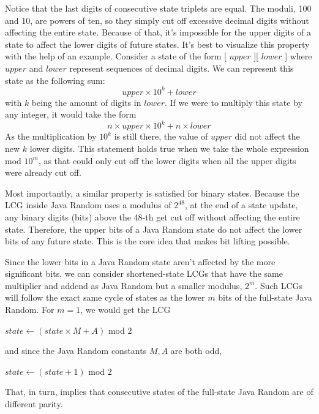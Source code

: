\documentclass{article}
\begin{document}
Notice that the last digits of consecutive state triplets are equal. The moduli, 100 and 10, are powers of ten, so they simply cut off excessive decimal digits without affecting the entire state. Because of that, it’s impossible for the upper digits of a state to affect the lower digits of future states. It’s best to visualize this property with the help of an example. Consider a state of the form [ $upper$ ][ $lower$ ] where $upper$ and $lower$ represent sequences of decimal digits. We can represent this state as the following sum:
\begin{equation}
    upper \times 10^k + lower
\end{equation}
\noindent with $k$ being the amount of digits in $lower$. If we were to multiply this state by any integer, it would take the form
\begin{equation}
    n \times upper \times 10^k + n \times lower
\end{equation}
\noindent As the multiplication by $10^k$ is still there, the value of $upper$ did not affect the new $k$ lower digits. This statement holds true when we take the whole expression mod $10^m$, as that could only cut off the lower digits when all the upper digits were already cut off.

Most importantly, a similar property is satisfied for binary states. Because the LCG inside Java Random uses a modulus of $2^{48}$, at the end of a state update, any binary digits (bits) above the 48-th get cut off without affecting the entire state. Therefore, the upper bits of a Java Random state do not affect the lower bits of any future state. This is the core idea that makes bit lifting possible.

Since the lower bits in a Java Random state aren’t affected by the more significant bits, we can consider shortened-state LCGs that have the same multiplier and addend as Java Random but a smaller modulus, $2^m$. Such LCGs will follow the exact same cycle of states as the lower $m$ bits of the full-state Java Random. For $m = 1$, we would get the LCG
\begin{algorithmic}
    \State $state \gets (state \times M + A)$ mod 2
\end{algorithmic}
\noindent and since the Java Random constants $M, A$ are both odd,
\begin{algorithmic}
    \State $state \gets (state + 1)$ mod 2
\end{algorithmic}
\noindent That, in turn, implies that consecutive states of the full-state Java Random are of different parity.
\end{document}

